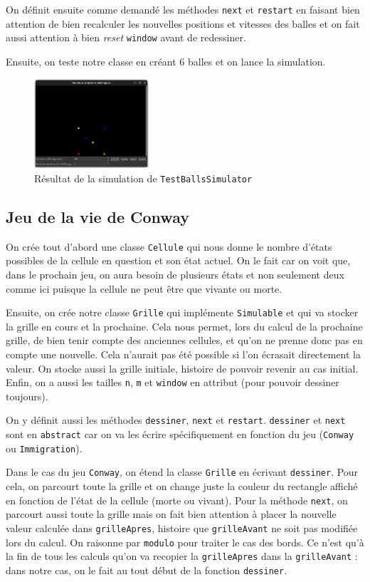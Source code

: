 \documentclass[a4paper, 11pt, french]{article}
\begin{document}
On définit ensuite comme demandé les méthodes \verb|next| et \verb|restart| en faisant bien attention de bien recalculer les nouvelles positions et vitesses des balles et on fait aussi attention à bien \textit{reset} \verb|window| avant de redessiner.

Ensuite, on teste notre classe en créant 6 balles et on lance la simulation.

\begin{figure}[H]
    \centering
    \includegraphics[width=0.38\textwidth]{TestBallsSimulator.png}
    \caption{Résultat de la simulation de \texttt{TestBallsSimulator}}
\end{figure}

\subsection{Jeu de la vie de Conway}

On crée tout d'abord une classe \verb|Cellule| qui nous donne le nombre d'états possibles de la cellule en question et son état actuel. On le fait car on voit que, dans le prochain jeu, on aura besoin de plusieurs états et non seulement deux comme ici puisque la cellule ne peut être que vivante ou morte.

Ensuite, on crée notre classe \verb|Grille| qui implémente \verb|Simulable| et qui va stocker la grille en cours et la prochaine. Cela nous permet, lors du calcul de la prochaine grille, de bien tenir compte des anciennes cellules, et qu'on ne prenne donc pas en compte une nouvelle. Cela n'aurait pas été possible si l'on écrasait directement la valeur. On stocke aussi la grille initiale, histoire de pouvoir revenir au cas initial. Enfin, on a aussi les tailles \verb|n|, \verb|m| et \verb|window| en attribut (pour pouvoir dessiner toujours).

On y définit aussi les méthodes \verb|dessiner|, \verb|next| et \verb|restart|. \verb|dessiner| et \verb|next| sont en \verb|abstract| car on va les écrire spécifiquement en fonction du jeu (\verb|Conway| ou \verb|Immigration|).

Dans le cas du jeu \verb|Conway|, on étend la classe \verb|Grille| en écrivant \verb|dessiner|. Pour cela, on parcourt toute la grille et on change juste la couleur du rectangle affiché en fonction de l'état de la cellule (morte ou vivant). Pour la méthode \verb|next|, on parcourt aussi toute la grille mais on fait bien attention à placer la nouvelle valeur calculée dans \verb|grilleApres|, histoire que \verb|grilleAvant| ne soit pas modifiée lors du calcul. On raisonne par \verb|modulo| pour traiter le cas des bords. Ce n'est qu'à la fin de tous les calculs qu'on va recopier la \verb|grilleApres| dans la \verb|grilleAvant| : dans notre cas, on le fait au tout début de la fonction \verb|dessiner|.
\end{document}
